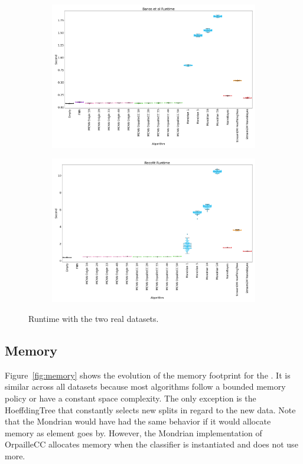 \begin{figure}
	\begin{subfigure}[t]{.5\linewidth}
		\includegraphics[width=\linewidth]{figures/results/banos_3_runtime.png}
		\caption{\banosdataset}
		\label{fig:runtime-banos}
	\end{subfigure}
	\begin{subfigure}[t]{.5\linewidth}
		\includegraphics[width=\linewidth]{figures/results/recofit_3_runtime.png}
		\caption{\recofitdataset}
		\label{fig:runtime-recofit}
	\end{subfigure}
	\caption{Runtime with the two real datasets.}
	\label{fig:runtime}
\end{figure}

\subsection{Memory}
\label{sec:result-memory}
Figure~\ref{fig:memory} shows the evolution of the memory footprint for the
\banosdataset.  It is similar across all datasets because most algorithms
follow a bounded memory policy or have a constant space complexity. The only
exception is the HoeffdingTree that constantly selects new splits in regard to
the new data. Note that the Mondrian would have had the same behavior if it
would allocate memory as element goes by. However, the Mondrian implementation
of OrpailleCC allocates memory when the classifier is instantiated and does not
use more.

